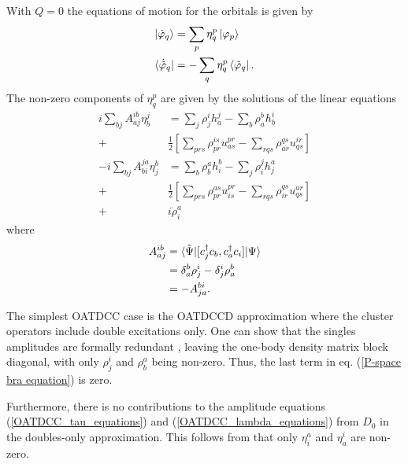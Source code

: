 \documentclass[aip,jcp,reprint,floatfix]{revtex4-1}
\begin{document}
With $Q=0$ the equations of motion for the orbitals is given by
\begin{align}
    \ket{\dot{\varphi}_q} &=  \sum_p \eta^p_q \ket{\varphi_p} \label{Reduced ket-orbital equation} \\
    \bra{\dot{\tilde{\varphi}}_q} &=  -\sum_q \eta^p_q \bra{\tilde{\varphi}_q} \label{Reduced bra-orbital equation}. 
\end{align}
The non-zero components of $\eta^p_q$ are given by the solutions of the linear equations
\begin{align}
    i \sum_{bj} A^{ib}_{aj} \eta^j_b &= \sum_j \rho^i_j h^j_a - \sum_b \rho^b_a h^i_b \nonumber \\
 + &\frac{1}{2} \left[\sum_{prs} \rho^{is}_{pr} u^{pr}_{as} - \sum_{rqs} \rho^{qs}_{ar} u^{ir}_{qs}  \right] \\
    -i \sum_{bj} A^{ja}_{bi} \eta^b_j &= \sum_b \rho^a_b h^b_i - \sum_j \rho^j_i h^a_j \nonumber \\
 + &\frac{1}{2} \left[ \sum_{prs} \rho^{as}_{pr} u^{pr}_{is} - \sum_{rqs} \rho^{qs}_{ir} u^{ar}_{qs} \right] \nonumber \\ 
 + &i \dot{\rho}_i^a \label{P-space bra equation}
\end{align}
where
\begin{align}
    A^{ib}_{aj} &= \braket{\tilde{\Psi}|[c_j^\dagger c_b,c_a^\dagger c_i]|\Psi} \nonumber \\
    &= \delta^b_a \rho^i_j - \delta^i_j \rho^b_a \nonumber  \\ 
    &= -A^{bi}_{ja}.
\end{align}

The simplest OATDCC case is the OATDCCD approximation where the cluster operators include double excitations only. One can show that the singles amplitudes are formally redundant \cite{OATDCC_2012}, leaving the one-body density matrix block diagonal, with only $\rho^i_j$ and $\rho^a_b$ being non-zero. Thus, the last term in eq. (\ref{P-space bra equation}) is zero. 

Furthermore, there is no contributions to the amplitude equations (\ref{OATDCC_tau_equations}) and (\ref{OATDCC_lambda_equations}) from $D_0$ in the doubles-only approximation. This follows from that only $\eta^a_i$ and $\eta^i_a$ are non-zero.
\end{document}
